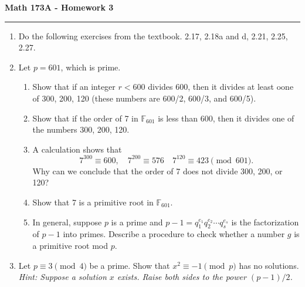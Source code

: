 \documentclass[11pt,letterpaper]{article}
\newcommand{\F}{\mathbb{F}}
\begin{document}
\begin{center}
{\bf \Large Math 173A - Homework 3}
\vspace{0.2cm}
\hrule
\end{center}



\begin{enumerate}

    \item Do the following exercises from the textbook. 2.17, 2.18a and d, 2.21, 2.25, 2.27.

    \item Let $p = 601$, which is prime.
    \begin{enumerate}
        \item Show that if an integer $r<600$ divides $600$, then it divides at least oone of 300, 200, 120 (these numbers are 600/2, 600/3, and 600/5).

        \item Show that if the order of 7 in $\F_{601}$ is less than 600, then it divides one of the numbers 300, 200, 120.

        \item A calculation shows that
        \[
            7^{300}\equiv 600,\quad 7^{200}\equiv 576\quad 7^{120}\equiv 423\pmod{601}.
        \]
        Why can we conclude that the order of 7 does not divide 300, 200, or 120?

        \item Show that 7 is a primitive root in $\F_{601}$.

        \item In general, suppose $p$ is a prime and $p-1 = q_1^{e_1}q_2^{e_2}\cdots q_s^{e_s}$ is the factorization of $p-1$ into primes. Describe a procedure to check whether a number $g$ is a primitive root mod $p$.
    \end{enumerate}

    \item Let $p \equiv 3\pmod 4$ be a prime.
    Show that $x^2 \equiv -1\pmod p$ has no solutions.
    \emph{Hint: Suppose a solution $x$ exists. Raise both sides to the power $(p-1)/2$.}

\end{enumerate}
\end{document}
